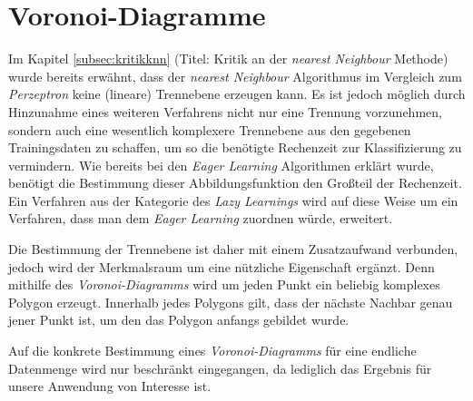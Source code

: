 \documentclass[fontsize=11pt]{scrartcl}
\begin{document}
        \section{Voronoi-Diagramme}
            Im Kapitel \ref{subsec:kritikknn} (Titel: Kritik an der \emph{nearest Neighbour} Methode) wurde bereits erwähnt, dass der \emph{nearest Neighbour} Algorithmus im Vergleich zum \emph{Perzeptron} keine (lineare) Trennebene erzeugen kann. Es ist jedoch möglich durch Hinzunahme eines weiteren Verfahrens nicht nur eine Trennung vorzunehmen, sondern auch eine wesentlich komplexere Trennebene aus den gegebenen Trainingsdaten zu schaffen, um so die benötigte Rechenzeit zur Klassifizierung zu vermindern.\cite{ertel2016}
            Wie bereits bei den \emph{Eager Learning} Algorithmen erklärt wurde, benötigt die Bestimmung dieser Abbildungsfunktion den Großteil der Rechenzeit. Ein Verfahren aus der Kategorie des \emph{Lazy Learnings} wird auf diese Weise um ein Verfahren, dass man dem \emph{Eager Learning} zuordnen würde, erweitert.\par Die Bestimmung der Trennebene ist daher mit einem Zusatzaufwand verbunden, jedoch wird der Merkmalsraum um eine nützliche Eigenschaft ergänzt. Denn mithilfe des \emph{Voronoi-Diagramms} wird um jeden Punkt ein beliebig komplexes Polygon erzeugt. Innerhalb jedes Polygons gilt, dass der nächste Nachbar genau jener Punkt ist, um den das Polygon anfangs gebildet wurde.\cite{ertel2016} \par
            
            Auf die konkrete Bestimmung eines \emph{Voronoi-Diagramms} für eine endliche Datenmenge wird nur beschränkt eingegangen, da lediglich das Ergebnis für unsere Anwendung von Interesse ist. %
                        
\end{document}
